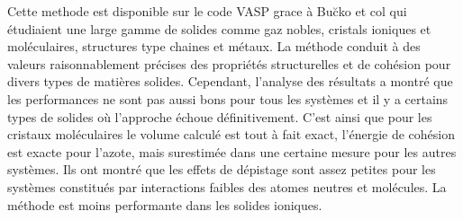 	Cette methode est disponible sur le code VASP grace à Bu\u{c}ko et col\cite{buvcko2013tkatchenko} qui étudiaient une large gamme de solides comme gaz nobles, cristals ioniques et moléculaires, structures type chaines et métaux. La méthode conduit à des valeurs raisonnablement précises des propriétés structurelles et de cohésion pour divers types de matières solides. Cependant, l'analyse des résultats a montré que les performances ne sont pas aussi bons pour tous les systèmes et il y a certains types de solides où l'approche échoue définitivement. C'est ainsi que pour les cristaux moléculaires le volume calculé est tout à fait exact, l'énergie de cohésion est exacte pour l'azote, mais surestimée dans une certaine mesure pour les autres systèmes. Ils ont montré que les effets de dépistage sont assez petites pour les systèmes constitués par interactions faibles des atomes neutres et molécules. La méthode est moins performante dans les solides ioniques.
